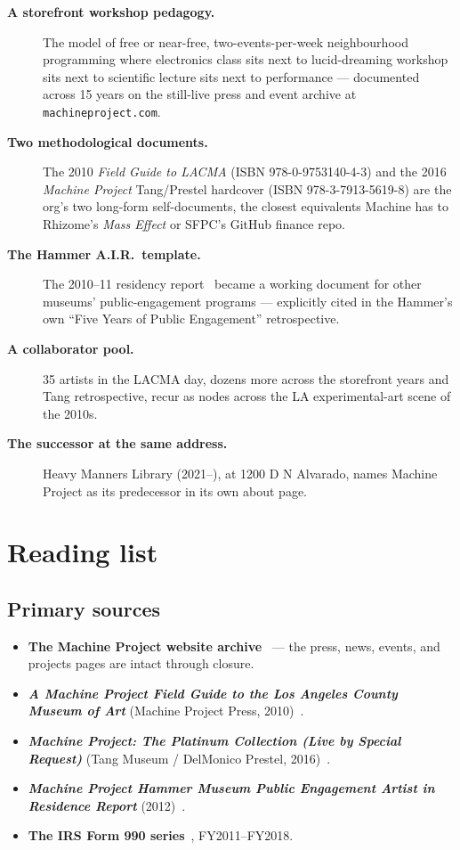 \documentclass[10pt,letterpaper,twocolumn]{article}
\begin{document}
\begin{description}
\item[\textbf{A storefront workshop pedagogy.}] The model of free or near-free, two-events-per-week neighbourhood programming where electronics class sits next to lucid-dreaming workshop sits next to scientific lecture sits next to performance --- documented across 15 years on the still-live press and event archive at \texttt{machineproject.com}.
\item[\textbf{Two methodological documents.}] The 2010 \emph{Field Guide to LACMA} (ISBN 978-0-9753140-4-3) and the 2016 \emph{Machine Project} Tang/Prestel hardcover (ISBN 978-3-7913-5619-8) are the org's two long-form self-documents, the closest equivalents Machine has to Rhizome's \emph{Mass Effect} or SFPC's GitHub finance repo.
\item[\textbf{The Hammer A.I.R.\ template.}] The 2010--11 residency report~\citep{hammerreport} became a working document for other museums' public-engagement programs --- explicitly cited in the Hammer's own ``Five Years of Public Engagement'' retrospective.
\item[\textbf{A collaborator pool.}] 35 artists in the LACMA day, dozens more across the storefront years and Tang retrospective, recur as nodes across the LA experimental-art scene of the 2010s.
\item[\textbf{The successor at the same address.}] Heavy Manners Library (2021--), at 1200 D N Alvarado, names Machine Project as its predecessor in its own about page.~\citep{heavymanners}
\end{description}

\section{Reading list}

\subsection{Primary sources}

\begin{itemize}
\item \textbf{The Machine Project website archive}~\citep{machineproject,machinearchivalabout} --- the press, news, events, and projects pages are intact through closure.
\item \textbf{\emph{A Machine Project Field Guide to the Los Angeles County Museum of Art}} (Machine Project Press, 2010)~\citep{fieldguidebook}.
\item \textbf{\emph{Machine Project: The Platinum Collection (Live by Special Request)}} (Tang Museum / DelMonico Prestel, 2016)~\citep{platinumbook}.
\item \textbf{\emph{Machine Project Hammer Museum Public Engagement Artist in Residence Report}} (2012)~\citep{hammerreport}.
\item \textbf{The IRS Form 990 series}~\citep{propublicamachine}, FY2011--FY2018.
\end{itemize}
\end{document}
